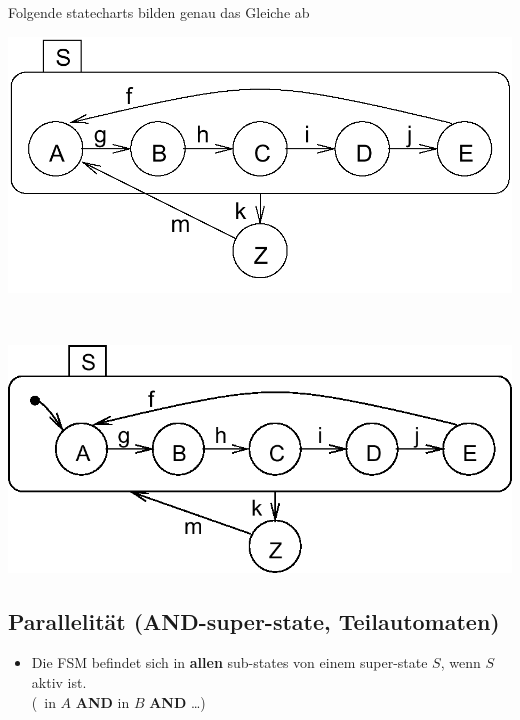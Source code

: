 Folgende statecharts bilden genau das Gleiche ab

\vspace{0.2cm}

\begin{minipage}[c]{0.41\columnwidth}
    \includegraphics[width=\columnwidth]{images/statechart_hierarchie.png}
\end{minipage}
\hfill
\begin{minipage}[c]{0.07\columnwidth}
    \begin{center}
        \huge \textlrarrow\
    \end{center}
\end{minipage}
\hfill
\begin{minipage}[c]{0.41\columnwidth}
    \includegraphics[width=\columnwidth]{images/statechart_default_state.png}
\end{minipage}


\subsection{Parallelität (AND-super-state, Teilautomaten)}

\begin{itemize}
    \item Die FSM befindet sich in \textbf{allen} sub-states von einem super-state $S$, wenn $S$ aktiv ist.\\
        (\textrightarrow\ in $A$ \textbf{AND} in $B$ \textbf{AND} \ldots)
\end{itemize}

